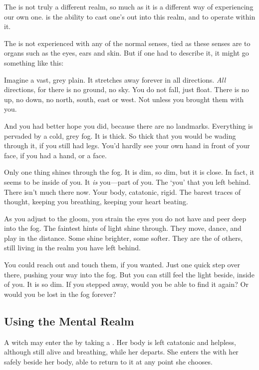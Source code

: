 The {\mentalrealm} is not truly a different realm, so much as it is a different way of experiencing our own one.
 is the ability to cast one's {\mind} out into this realm, and to operate within it.

The {\mentalrealm} is not experienced with any of the normal senses, tied as these senses are to organs such as the eyes, ears and skin.
But if one had to describe it, it might go something like this:

Imagine a vast, grey plain.
It stretches away forever in all directions.
\emph{All} directions, for there is no ground, no sky.
You do not fall, just float.
There is no up, no down, no north, south, east or west.
Not unless you brought them with you.

And you had better hope you did, because there are no landmarks.
Everything is pervaded by a cold, grey fog.
It is thick.
So thick that you would be wading through it, if you still had legs.
You'd hardly see your own hand in front of your face, if you had a hand, or a face.

Only one thing shines through the fog.
It is dim, so dim, but it is close.
In fact, it seems to be inside of you.
It \emph{is} you---part of you.
The `you' that you left behind.
There isn't much there now.
Your body, catatonic, rigid.
The barest traces of thought, keeping you breathing, keeping your heart beating.

As you adjust to the gloom, you strain the eyes you do not have and peer deep into the fog.
The faintest hints of light shine through.
They move, dance, and play in the distance.
Some shine brighter, some softer.
They are the {\minds} of others, still living in the realm you have left behind.

You could reach out and touch them, if you wanted.
Just one quick step over there, pushing your way into the fog.
But you can still feel the light beside, inside of you.
It is so dim.
If you stepped away, would you be able to find it again?
Or would you be lost in the fog forever?

\subsection{Using the Mental Realm}

A witch may enter the {\mentalrealm} by taking a .
Her body is left catatonic and helpless, although still alive and breathing, while her {\mind} departs.
She enters the {\mentalrealm} with her {\mind} safely beside her body, able to return to it at any point she chooses.


